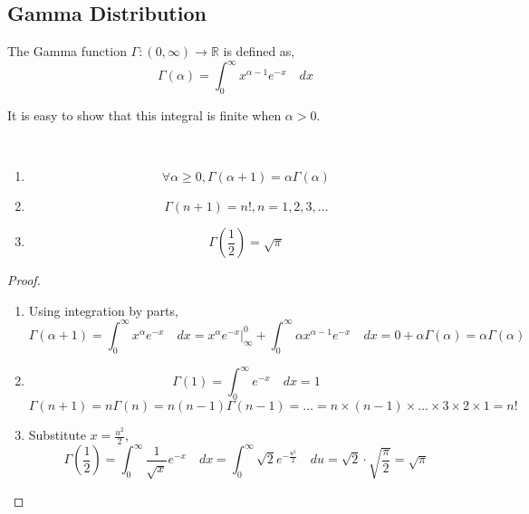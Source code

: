 \subsection{Gamma Distribution}
\begin{definition}
The Gamma function $\Gamma : (0, \infty) \rightarrow \mathbb{R}$ is defined as,
\[
    \Gamma(\alpha) = \int_{0}^{\infty} x^{\alpha - 1} e^{-x} \quad dx
\]
\end{definition}
\note It is easy to show that this integral is finite when $\alpha > 0$.

\begin{theorem} \quad                                                        \\
\begin{enumerate}[noitemsep, topsep=0em]
\item \[ \forall \alpha \geq 0, \Gamma(\alpha + 1) = \alpha \Gamma(\alpha) \]
\item \[ \Gamma(n + 1) = n!, n = 1, 2, 3, \dots                            \]
\item \[ \Gamma(\frac{1}{2}) = \sqrt{\pi}                                  \]
\end{enumerate}
\end{theorem}
\begin{proof} \quad                                                          \\
\begin{enumerate}[noitemsep, topsep=0em]
\item Using integration by parts,
\[
      \Gamma(\alpha + 1) = \int_0^{\infty} x^\alpha e^{-x} \quad dx
    = \left. x^\alpha e^{-x} \right\vert_{\infty}^0 +
      \int_0^{\infty} \alpha x^{\alpha - 1} e^{-x} \quad dx
    = 0 + \alpha \Gamma(\alpha)
    = \alpha \Gamma(\alpha)
\]
\item
\[
    \Gamma(1) = \int_{0}^{\infty} e^{-x} \quad dx = 1
\]
\[
    \Gamma(n + 1) = n \Gamma(n)
                  = n (n - 1) \Gamma(n - 1)
                  = \dots
                  = n \times (n - 1) \times \dots \times 3 \times 2 \times 1
                  = n!
\]
\item Substitute $x = \frac{u^2}{2}$, 
\[
    \Gamma(\frac{1}{2}) = \int_{0}^{\infty} \frac{1}{\sqrt{x}} e^{-x} \quad dx
                        = \int_{0}^{\infty} \sqrt{2} e^{-\frac{u^2}{2}} \quad
                          du
                        = \sqrt{2} \cdot \sqrt{\frac{\pi}{2}}
                        = \sqrt{\pi}
\]
\end{enumerate}
\end{proof}